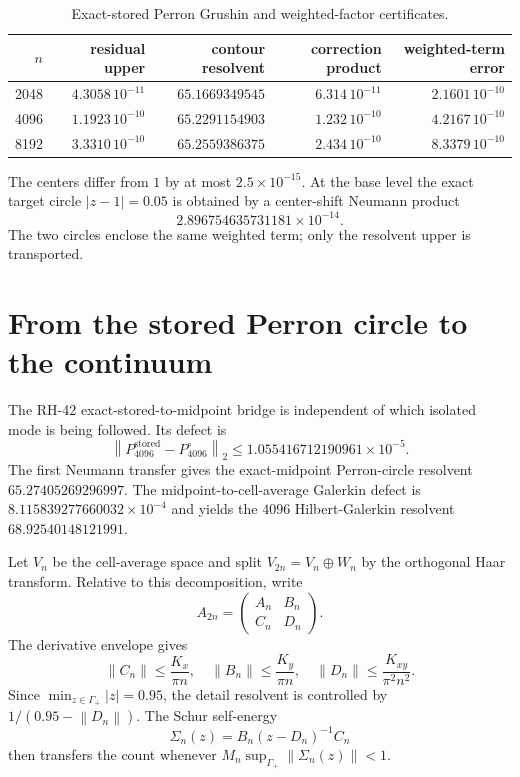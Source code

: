 \documentclass[11pt]{article}
\theoremstyle{definition}
\theoremstyle{remark}
\newcommand{\C}{\mathbb C}
\newcommand{\norm}[1]{\left\lVert #1\right\rVert}
\begin{document}
\begin{table}[H]
\centering
\small
\caption{Exact-stored Perron Grushin and weighted-factor certificates.}
\label{tab:perron-factors}
\begin{tabular}{@{}rrrrr@{}}
\toprule
$n$ & residual upper & contour resolvent & correction product
    & weighted-term error\\
\midrule
2048 & $4.3058\,10^{-11}$ & $65.1669349545$ & $6.314\,10^{-11}$
     & $2.1601\,10^{-10}$\\
4096 & $1.1923\,10^{-10}$ & $65.2291154903$ & $1.232\,10^{-10}$
     & $4.2167\,10^{-10}$\\
8192 & $3.3310\,10^{-10}$ & $65.2559386375$ & $2.434\,10^{-10}$
     & $8.3379\,10^{-10}$\\
\bottomrule
\end{tabular}
\end{table}

The centers differ from $1$ by at most $2.5\times10^{-15}$.  At the base
level the exact target circle $|z-1|=0.05$ is obtained by a center-shift
Neumann product
\begin{equation}
 2.896754635731181\times10^{-14}.
 \label{eq:center-shift}
\end{equation}
The two circles enclose the same weighted term; only the resolvent upper is
transported.

\section{From the stored Perron circle to the continuum}
\label{sec:perron-continuum}

The RH-42 exact-stored-to-midpoint bridge is independent of which isolated
mode is being followed.  Its defect is
\begin{equation}
 \norm{P_{4096}^{\mathrm{stored}}-P_{4096}^\circ}_2
 \le1.055416712190961\times10^{-5}.
 \label{eq:stored-midpoint-defect}
\end{equation}
The first Neumann transfer gives the exact-midpoint Perron-circle resolvent
$65.27405269296997$.  The midpoint-to-cell-average Galerkin defect is
$8.115839277660032\times10^{-4}$ and yields the $4096$ Hilbert-Galerkin
resolvent $68.92540148121991$.

Let $V_n$ be the cell-average space and split
$V_{2n}=V_n\oplus W_n$ by the orthogonal Haar transform.  Relative to this
decomposition, write
\[
 A_{2n}=
 \begin{pmatrix}A_n&B_n\\C_n&D_n\end{pmatrix}.
\]
The derivative envelope gives
\[
 \norm{C_n}\le\frac{K_x}{\pi n},
 \quad
 \norm{B_n}\le\frac{K_y}{\pi n},
 \quad
 \norm{D_n}\le\frac{K_{xy}}{\pi^2n^2}.
\]
Since $\min_{z\in\Gamma_+}|z|=0.95$, the detail resolvent is controlled by
$1/(0.95-\norm{D_n})$.  The Schur self-energy
\[
 \Sigma_n(z)=B_n(z-D_n)^{-1}C_n
\]
then transfers the count whenever
$M_n\sup_{\Gamma_+}\norm{\Sigma_n(z)}<1$.
\end{document}
